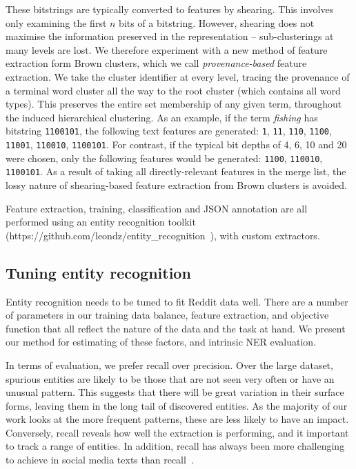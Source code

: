 \documentclass[journal,10pt,draftclsnofoot,onecolumn]{IEEEtran}
\begin{document}
These bitstrings are typically converted to features by shearing.
This involves only examining the first $n$ bits of a bitstring.
However, shearing does not maximise the information preserved in the representation -- sub-clusterings at many levels are lost.
We therefore experiment with a new method of feature extraction form Brown clusters, which we call {\em provenance-based} feature extraction.
We take the cluster identifier at every level, tracing the provenance of a terminal word cluster all the way to the root cluster (which contains all word types).
This preserves the entire set membership of any given term, throughout the induced hierarchical clustering.
As an example, if the term \emph{fishing} has bitstring {\tt 1100101}, the following text features are generated: {\tt 1}, {\tt 11}, {\tt 110}, {\tt 1100}, {\tt 11001}, {\tt 110010}, {\tt 1100101}.
For contrast, if the typical bit depths of 4, 6, 10 and 20~\cite{ratinov2009design} were chosen, only the following features would be generated: {\tt 1100}, {\tt 110010}, {\tt 1100101}.
As a result of taking all directly-relevant features in the merge list, the lossy nature of shearing-based feature extraction from Brown clusters is avoided.

Feature extraction, training, classification and JSON annotation are all performed using an entity recognition toolkit (https://github.com/leondz/entity\_recognition~\cite{derczynski2015usfd}), with custom extractors.


\subsection{Tuning entity recognition}

Entity recognition needs to be tuned to fit Reddit data well.
There are a number of parameters in our training data balance, feature extraction, and objective function that all reflect the nature of the data and the task at hand.
We present our method for estimating of these factors, and intrinsic NER evaluation.

In terms of evaluation, we prefer recall over precision.
Over the large dataset, spurious entities are likely to be those that are not seen very often or have an unusual pattern.
This suggests that there will be great variation in their surface forms, leaving them in the long tail of discovered entities.
As the majority of our work looks at the more frequent patterns, these are less likely to have an impact.
Conversely, recall reveals how well the extraction is performing, and it important to track a range of entities.
In addition, recall has always been more challenging to achieve in social media texts than recall~\cite{ritter2011named,derczynski2015analysis}.
\end{document}
